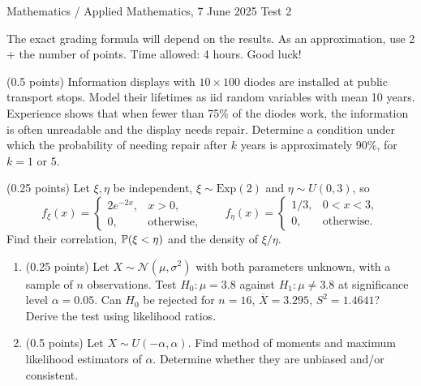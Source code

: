 \documentclass[a4paper]{report}
\begin{document}
\noindent Mathematics / Applied Mathematics, 7 June 2025 \hfill Test 2
\hrulefill
\begin{it}The exact grading formula will depend on the results. As an approximation, use 2 + the number of points. Time allowed: 4 hours. Good luck!\end{it}
\begin{problem} (0.5 points)
Information displays with $10\times100$ diodes are installed at public transport stops. Model their lifetimes as iid random variables with mean 10 years. Experience shows that when fewer than 75\% of the diodes work, the information is often unreadable and the display needs repair. Determine a condition under which the probability of needing repair after $k$ years is approximately 90\%, for $k=1$ or $5$.
\end{problem}
\begin{problem} (0.25 points)
Let $\xi,\eta$ be independent, $\xi\sim\mathrm{Exp}(2)$ and $\eta\sim U(0,3)$, so
\[f_\xi(x)=\begin{cases}2e^{-2x},&x>0,\\0,&\text{otherwise,}\end{cases}\qquad f_\eta(x)=\begin{cases}1/3,&0<x<3,\\0,&\text{otherwise.}\end{cases}\]
Find their correlation, $\P(\xi<\eta)$ and the density of $\xi/\eta$.
\end{problem}
\begin{problem}
\begin{enumerate}
\item (0.25 points) Let $X\sim\mathcal N(\mu,\sigma^2)$ with both parameters unknown, with a sample of $n$ observations. Test $H_0:\mu=3.8$ against $H_1:\mu\neq3.8$ at significance level $\alpha=0.05$. Can $H_0$ be rejected for $n=16$, $\overline X=3.295$, $S^2=1.4641$? Derive the test using likelihood ratios.
\item (0.5 points) Let $X\sim U(-\alpha,\alpha)$. Find method of moments and maximum likelihood estimators of $\alpha$. Determine whether they are unbiased and/or consistent.
\end{enumerate}
\end{problem}
\end{document}
